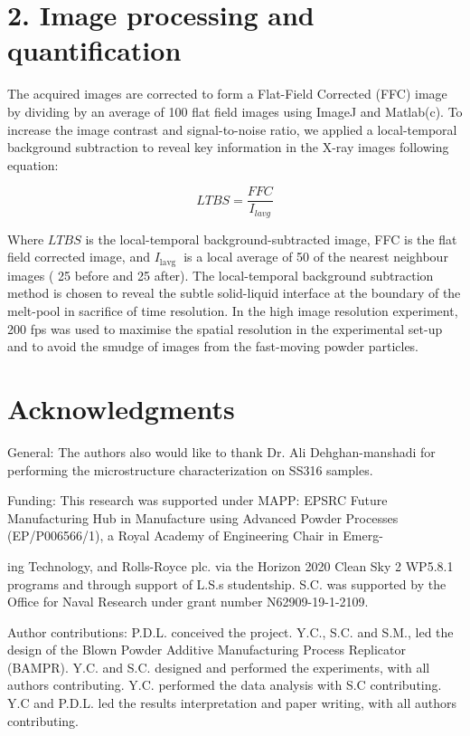 \documentclass[10pt]{article}
\begin{document}
\section*{2. Image processing and quantification}
The acquired images are corrected to form a Flat-Field Corrected (FFC) image by dividing by an average of 100 flat field images using ImageJ and Matlab(c). To increase the image contrast and signal-to-noise ratio, we applied a local-temporal background subtraction to reveal key information in the X-ray images following equation:


\begin{equation*}
L T B S=\frac{F F C}{I_{l a v g}} \tag{1}
\end{equation*}


Where $L T B S$ is the local-temporal background-subtracted image, FFC is the flat field corrected image, and $I_{\text {lavg }}$ is a local average of 50 of the nearest neighbour images ( 25 before and 25 after). The local-temporal background subtraction method is chosen to reveal the subtle solid-liquid interface at the boundary of the melt-pool in sacrifice of time resolution. In the high image resolution experiment, 200 fps was used to maximise the spatial resolution in the experimental set-up and to avoid the smudge of images from the fast-moving powder particles.

\section*{Acknowledgments}
General: The authors also would like to thank Dr. Ali Dehghan-manshadi for performing the microstructure characterization on SS316 samples.

Funding: This research was supported under MAPP: EPSRC Future Manufacturing Hub in Manufacture using Advanced Powder Processes (EP/P006566/1), a Royal Academy of Engineering Chair in Emerg-

ing Technology, and Rolls-Royce plc. via the Horizon 2020 Clean Sky 2 WP5.8.1 programs and through support of L.S.s studentship. S.C. was supported by the Office for Naval Research under grant number N62909-19-1-2109.

Author contributions: P.D.L. conceived the project. Y.C., S.C. and S.M., led the design of the Blown Powder Additive Manufacturing Process Replicator (BAMPR). Y.C. and S.C. designed and performed the experiments, with all authors contributing. Y.C. performed the data analysis with S.C contributing. Y.C and P.D.L. led the results interpretation and paper writing, with all authors contributing.
\end{document}
